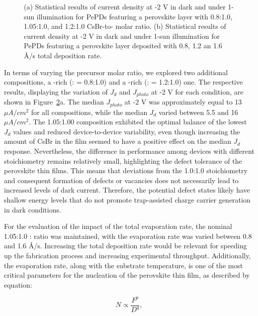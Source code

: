 \begin{figure}[htbp]
\begin{subfigure}[t]{0.45\textwidth}
        \caption{}
        \label{fig:etl:opt:evap_rate}
    \end{subfigure}    
    \caption{(a) Statistical results of current density at -2 V in dark and under 1-sun illumination for PePDs featuring a perovskite layer with 0.8:1.0, 1.05:1.0, and 1.2:1.0 CsBr-to- molar ratio. (b) Statistical results of current density at -2 V in dark and under 1-sun illumination for PePDs featuring a perovskite layer deposited with 0.8, 1.2 an 1.6 \AA/s total deposition rate. }
    \label{fig:etl_opt:molar_and_rate}
\end{figure}

In terms of varying the precursor molar ratio, we explored two additional compositions, a -rich (: = 0.8:1.0) and a -rich (: = 1.2:1.0) one. The respective results, displaying the variation of $J_d$ and $J_{photo}$ at -2 V for each condition, are shown in Figure~\ref{fig:etl_opt:molar_and_rate}a. The median $J_{photo}$ at -2 V was approximately equal to 13 $\mu A/cm^2$ for all compositions, while the median $J_d$ varied between 5.5 and 16 $\mu A/cm^2$. The 1.05:1.00 composition exhibited the optimal balance of the lowest $J_d$ values and reduced device-to-device variability, even though increasing the amount of CsBr in the film seemed to have a positive effect on the median $J_d$ response. Nevertheless, the difference in performance among devices with different stoichiometry remains relatively small, highlighting the defect tolerance of the perovskite thin films. This means that deviations from the 1.0:1.0 stoichiometry and consequent formation of defects or vacancies does not necessarily lead to increased levels of dark current. Therefore, the potential defect states likely have shallow energy levels that do not promote trap-assisted charge carrier generation in dark conditions.


For the evaluation of the impact of the total evaporation rate, the nominal 1.05:1.0 : ratio was maintained, with the evaporation rate was varied between 0.8 and 1.6 \AA/s. Increasing the total deposition rate would be relevant for speeding up the fabrication process and increasing experimental throughput. Additionally, the evaporation rate, along with the substrate temperature, is one of the most critical parameters for the nucleation of the perovskite thin film, as described by equation: 

\begin{equation}
    N \propto \frac{F^p}{D^q}, 
\end{equation}

